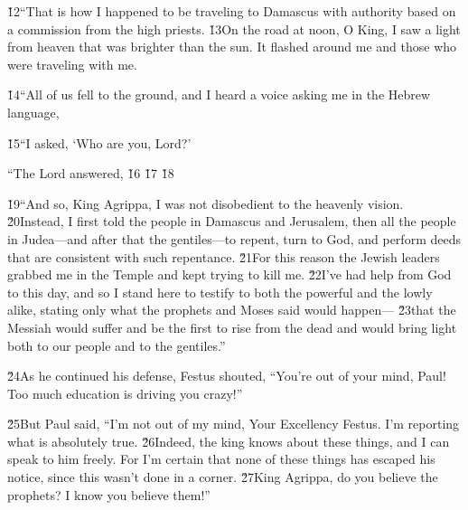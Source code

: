 \v{12}``That is how I happened to be traveling to Damascus with authority based on a commission from the high priests. \v{13}On the road at noon, O King, I saw a light from heaven that was brighter than the sun. It flashed around me and those who were traveling with me.

\v{14}``All of us fell to the ground, and I heard a voice asking me in the Hebrew language, 

\v{15}``I asked, `Who are you, Lord?'

``The Lord answered,  \v{16} \v{17} \v{18}

\v{19}``And so, King Agrippa, I was not disobedient to the heavenly vision. \v{20}Instead, I first told the people in Damascus and Jerusalem, then all the people in Judea---and after that the gentiles---to repent, turn to God, and perform deeds that are consistent with such repentance. \v{21}For this reason the Jewish leaders grabbed me in the Temple and kept trying to kill me. \v{22}I've had help from God to this day, and so I stand here to testify to both the powerful and the lowly alike, stating only what the prophets and Moses said would happen--- \v{23}that the Messiah would suffer and be the first to rise from the dead and would bring light both to our people and to the gentiles.''

\v{24}As he continued his defense, Festus shouted, ``You're out of your mind, Paul! Too much education is driving you crazy!''

\v{25}But Paul said, ``I'm not out of my mind, Your Excellency Festus. I'm reporting what is absolutely true. \v{26}Indeed, the king knows about these things, and I can speak to him freely. For I'm certain that none of these things has escaped his notice, since this wasn't done in a corner. \v{27}King Agrippa, do you believe the prophets? I know you believe them!''

